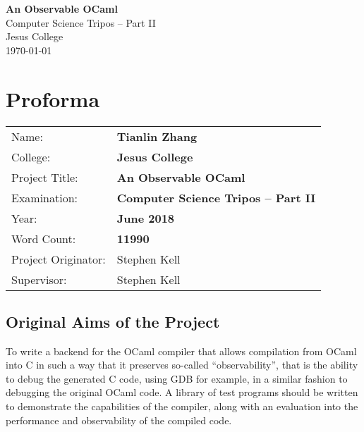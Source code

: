 \documentclass[12pt,a4paper,twoside,openright]{report}
\begin{document}





\pagestyle{empty}


\vspace*{60mm}
\begin{center}
\Huge
\textbf{An Observable OCaml} \\[5mm]
Computer Science Tripos -- Part II \\[5mm]
Jesus College \\[5mm]
\today  %
\end{center}


\pagestyle{plain}

\chapter*{Proforma}

{\large
\begin{tabular}{ll}
Name:               & \bf Tianlin Zhang \\
College:            & \bf Jesus College\\
Project Title:      & \bf An Observable OCaml\\
Examination:        & \bf Computer Science Tripos -- Part II\\
Year:               & \bf June 2018\\
Word Count:         & \bf 11990\footnotemark \\
Project Originator: & Stephen Kell \\
Supervisor:         & Stephen Kell \\ 
\end{tabular}
}

\section*{Original Aims of the Project}

To write a backend for the OCaml compiler that allows compilation from OCaml 
into C in such a way that it preserves so-called ``observability'', that is the 
ability to debug the generated C code, using GDB for example, in a similar 
fashion to debugging the original OCaml code. A library of test programs should 
be written to demonstrate the capabilities of the compiler, along with an 
evaluation into the performance and observability of the compiled code.
\end{document}
